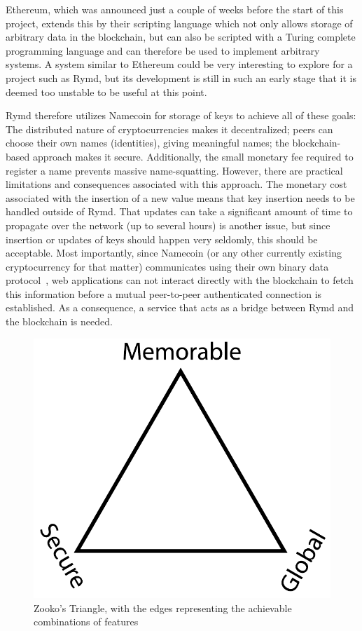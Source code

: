 Ethereum, which was announced just a couple of weeks before the start of this project, extends this by their scripting language which not only allows storage of arbitrary data in the blockchain, but can also be scripted with a Turing complete programming language and can therefore be used to implement arbitrary systems. A system similar to Ethereum could be very interesting to explore for a project such as Rymd, but its development is still in such an early stage that it is deemed too unstable to be useful at this point.

Rymd therefore utilizes Namecoin for storage of keys to achieve all of these goals: The distributed nature of cryptocurrencies makes it decentralized; peers can choose their own names (identities), giving meaningful names; the blockchain-based approach makes it secure. Additionally, the small monetary fee required to register a name prevents massive name-squatting. However, there are practical limitations and consequences associated with this approach. The monetary cost associated with the insertion of a new value means that key insertion needs to be handled outside of Rymd. That updates can take a significant amount of time to propagate over the network (up to several hours) is another issue, but since insertion or updates of keys should happen very seldomly, this should be acceptable. Most importantly, since Namecoin (or any other currently existing cryptocurrency for that matter) communicates using their own binary data protocol~\cite{BitcoinSource:2014:Online}, web applications can not interact directly with the blockchain to fetch this information before a mutual peer-to-peer authenticated connection is established. As a consequence, a service that acts as a bridge between Rymd and the blockchain is needed.

\begin{figure}[ht]
\centering
\includegraphics[width=\textwidth,height=0.2\paperheight,keepaspectratio
]{figures/Zooko_s_Triangle}
\caption{Zooko's Triangle, with the edges representing the achievable combinations of features~\cite{WikiMedia:2006}}
\label{fig:zooko}
\end{figure}

